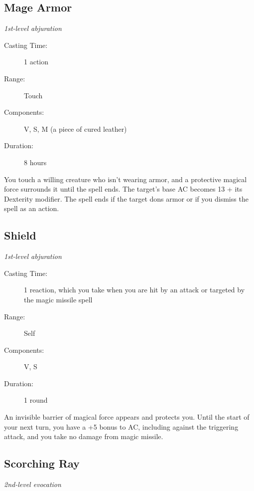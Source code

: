 \documentclass[letterpaper,10pt,twoside,twocolumn,openany]{book}
\begin{document}
\subsection{Mage Armor} \hypertarget{Mage Armor}{}
\begin{hangingpar}
	\textit{1st-level abjuration}
\end{hangingpar}

\begin{description}
	\item[Casting Time:] 1 action 
	\item[Range:] Touch 
	\item[Components:] V, S, M (a piece of cured leather)
	\item[Duration:] 8 hours 
\end{description}

You touch a willing creature who isn't wearing armor, and a protective magical force surrounds it until the spell ends. The target's base AC becomes 13 + its Dexterity modifier. The spell ends if the target dons armor or if you dismiss the spell as an action. 

\subsection{Shield} \hypertarget{Shield}{}
\begin{hangingpar}
	\textit{1st-level abjuration}
\end{hangingpar}

\begin{description}
	\item[Casting Time:]  1 reaction, which you take when you are hit by an attack or targeted by the magic missile spell 
	\item[Range:] Self 
	\item[Components:] V, S 
	\item[Duration:] 1 round 
\end{description}

An invisible barrier of magical force appears and protects you. Until the start of your next turn, you have a +5 bonus to AC, including against the triggering attack, and you take no damage from magic missile. 

\subsection{Scorching Ray} \hypertarget{Scorching Ray}{}
\begin{hangingpar}
	\textit{2nd-level evocation}
\end{hangingpar}
\end{document}
